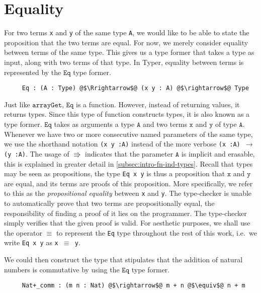 \documentclass[12pt,twoside,maitrise]{dms}
\theoremstyle{definition}
\numberwithin{equation}{section}
\numberwithin{table}{chapter}
\numberwithin{figure}{chapter}
\newcommand\id[1] {\texttt{#1}}
\newcommand\fn[1] {\texttt{#1}}
\begin{document}
\section{Equality}\label{sec:intro-eq}

For two terms \id{x} and \id{y} of the same type \id{A}, we would like to be
able to state the proposition that the two terms are equal. For now, we merely
consider equality between terms of the same type. This gives us a type former
that takes a type as input, along with two terms of that type. In Typer,
equality between terms is represented by the $\id{Eq}$ type former.

\begin{verbatim}
     Eq : (A : Type) @$\Rrightarrow$@ (x y : A) @$\rightarrow$@ Type
\end{verbatim}

Just like $\id{arrayGet}$, $\id{Eq}$ is a function. However, instead of
returning values, it returns types. Since this type of function constructs
types, it is also known as a type former. $\id{Eq}$ takes as arguments a type
$\id{A}$ and two terms $\id{x}$ and $\id{y}$ of type $\id{A}$. Whenever we have
two or more consecutive named parameters of the same type, we use the shorthand
notation \fn{(x y :\@ A)} instead of the more verbose \fn{(x :\@ A)
$\rightarrow$ (y :\@ A)}. The usage of $\Rrightarrow$ indicates that the
parameter $\id{A}$ is implicit and erasable, this is explained in greater
detail in \autoref{subsec:intro-fn-ind-types}. Recall that types may be seen as
propositions, the type \fn{Eq x y} is thus a proposition that $\fn{x}$ and
$\fn{y}$ are equal, and its terms are proofs of this proposition. More
specifically, we refer to this as the \emph{propositional equality} between
\id{x} and \id{y}. The type-checker is unable to automatically prove that two
terms are propositionally equal, the responsibility of finding a proof of it
lies on the programmer. The type-checker simply verifies that the given proof
is valid. For aesthetic purposes, we shall use the operator $\equiv$ to
represent the \id{Eq} type throughout the rest of this work, i.e.\ we write
\fn{Eq x y} as \fn{x $\equiv$ y}.

We could then construct the type that stipulates that the addition of natural
numbers is commutative by using the $\id{Eq}$ type former.

\begin{verbatim}
     Nat+_comm : (m n : Nat) @$\rightarrow$@ m + n @$\equiv$@ n + m
\end{verbatim}
\end{document}

